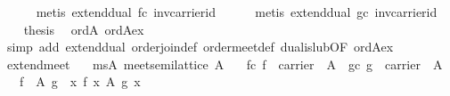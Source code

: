 \begin{isabellebody}
\ \ \ \ \isamarkupfalse%
\ {}metis\ extend{}dual\ fc\ inv{}carrier{}id{}\isanewline
\ \ \ \ \isamarkupfalse%
\ {}metis\ extend{}dual\ gc\ inv{}carrier{}id{}\isanewline
\ \ \isamarkupfalse%
\ {}thesis\ \isamarkupfalse%
\ ord{}A\ ord{}A{}ex\isanewline
\ \ \ \ \isamarkupfalse%
\ {}simp\ add{}\ extend{}dual\ order{}join{}def\ order{}meet{}def\ dual{}is{}lub{}OF\ ord{}A{}ex{}{}\isanewline
{}\isamarkupfalse%
%
\endisatagproof
{\isafoldproof}%
%
\isadelimproof
\isanewline
%
\endisadelimproof
\isanewline
{}\isamarkupfalse%
\ extend{}meet{}\isanewline
\ \ \ ms{}A{}\ {}meet{}semilattice\ A{}\isanewline
\ \ \ fc{}\ {}f\ {}\ carrier\ {}{}\ A{}{}\ \ gc{}\ {}g\ {}\ carrier\ {}{}\ A{}{}\isanewline
\ \ \ {}f\ {}\ A\isactrlesub \ g\ {}\ {}{}x{}\ f\ x\ {}\isactrlbsub A\isactrlesub \ g\ x{}{}\isanewline

\end{isabellebody}
